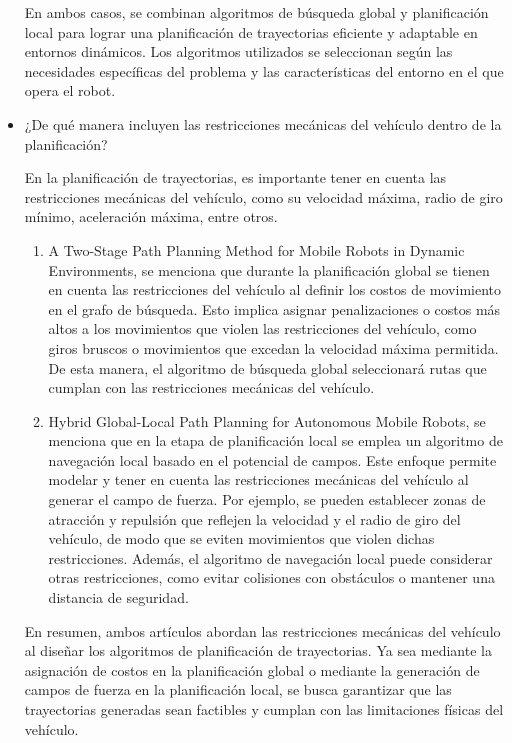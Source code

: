 \documentclass{article}
\begin{document}
\begin{itemize}
\begin{enumerate}
  \end{enumerate}

  En ambos casos, se combinan algoritmos de búsqueda global y planificación local para lograr una planificación de trayectorias eficiente y adaptable en entornos dinámicos. Los algoritmos utilizados se seleccionan según las necesidades específicas del problema y las características del entorno en el que opera el robot.
  
\item ¿De qué manera incluyen las restricciones mecánicas del vehículo dentro de la planificación?

  En la planificación de trayectorias, es importante tener en cuenta las restricciones mecánicas del vehículo, como su velocidad máxima, radio de giro mínimo, aceleración máxima, entre otros.

  \begin{enumerate}
  \item A Two-Stage Path Planning Method for Mobile Robots in Dynamic Environments, se menciona que durante la planificación global se tienen en cuenta las restricciones del vehículo al definir los costos de movimiento en el grafo de búsqueda. Esto implica asignar penalizaciones o costos más altos a los movimientos que violen las restricciones del vehículo, como giros bruscos o movimientos que excedan la velocidad máxima permitida. De esta manera, el algoritmo de búsqueda global seleccionará rutas que cumplan con las restricciones mecánicas del vehículo.

  \item Hybrid Global-Local Path Planning for Autonomous Mobile Robots, se menciona que en la etapa de planificación local se emplea un algoritmo de navegación local basado en el potencial de campos. Este enfoque permite modelar y tener en cuenta las restricciones mecánicas del vehículo al generar el campo de fuerza. Por ejemplo, se pueden establecer zonas de atracción y repulsión que reflejen la velocidad y el radio de giro del vehículo, de modo que se eviten movimientos que violen dichas restricciones. Además, el algoritmo de navegación local puede considerar otras restricciones, como evitar colisiones con obstáculos o mantener una distancia de seguridad.
    
  \end{enumerate}
  En resumen, ambos artículos abordan las restricciones mecánicas del vehículo al diseñar los algoritmos de planificación de trayectorias. Ya sea mediante la asignación de costos en la planificación global o mediante la generación de campos de fuerza en la planificación local, se busca garantizar que las trayectorias generadas sean factibles y cumplan con las limitaciones físicas del vehículo.
\end{itemize}
\end{document}
